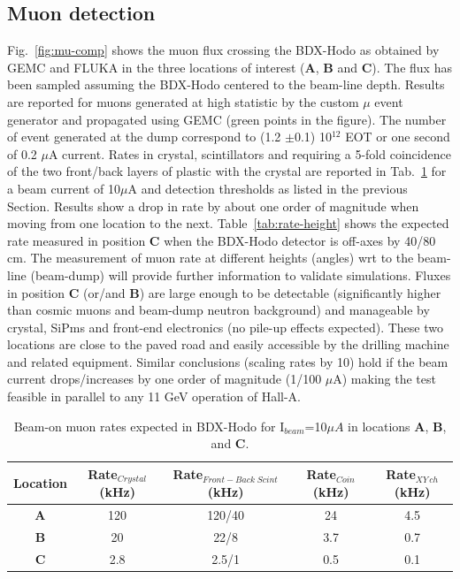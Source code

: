 \subsection{Muon detection}
Fig.~\ref{fig:mu-comp} shows the muon flux crossing the BDX-Hodo  as obtained by GEMC and FLUKA  in the  three locations of interest ({\bf A}, {\bf B} and {\bf C}).
The flux has been sampled assuming the BDX-Hodo centered to  the beam-line depth.
Results are reported for muons generated at high statistic by the custom $\mu$ event generator and propagated using GEMC (green points in the figure).
The number of event generated at the dump correspond to  (1.2 $\pm$0.1) 10$^{12}$ EOT or one second of 0.2 $\mu$A current.
Rates in crystal, scintillators and  requiring a 5-fold coincidence of the two front/back layers of plastic with  the crystal are reported in Tab.~\ref{tab:rate} for a beam current of 10$\mu$A and detection thresholds as listed in the previous Section. Results show a drop in rate by about one order of magnitude when moving from one location to the next. 
Table~\ref{tab:rate-height}  shows the expected rate measured in  position {\bf C}  when the BDX-Hodo detector is off-axes by 40/80 cm. The measurement of muon rate at different heights (angles) wrt to the beam-line (beam-dump) will provide further information to validate simulations.  
Fluxes in position {\bf C} (or/and {\bf B}) are large enough to be detectable (significantly higher than cosmic muons and beam-dump neutron background) and manageable  by crystal, SiPms and front-end electronics (no pile-up effects expected). These two locations are close to the paved road and easily accessible by the drilling machine and related equipment. Similar conclusions (scaling rates by 10) hold  if the beam current drops/increases by one order of magnitude (1/100 $\mu$A) making the test feasible in parallel to any 11 GeV operation of Hall-A.

\begin{table}[htp]
\caption{Beam-on muon rates expected in BDX-Hodo for I$_{beam}$=10$\mu A$ in locations {\bf A}, {\bf B},  and {\bf C}.}
\begin{center}
\begin{tabular}{|c|c|c|c|c|}
\hline
Location & Rate$_{Crystal}$  (kHz)&  Rate$_{Front-Back \;Scint} $(kHz) & Rate$_{Coin}$ (kHz) & Rate$_{XY\, ch} $(kHz)\\
\hline\hline
{\bf A}  & 120  &120/40    & 24 &4.5 \\
 \hline
{\bf B} & 20 &  22/8 & 3.7 & 0.7\\
 \hline
{\bf C} & 2.8 &  2.5/1 & 0.5 & 0.1 \\
\hline\hline
\end{tabular}
\end{center}
\label{tab:rate}
\end{table}%

